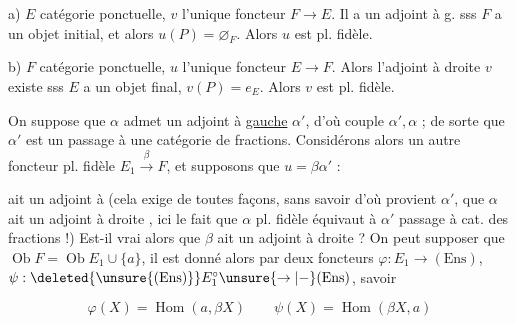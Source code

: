 

a) $E$ catégorie ponctuelle, $v$ l'unique foncteur $F\to E$. Il a un adjoint à g.  sss $F$ a un objet initial, et alors $u(P)=\varnothing_F$. Alors $u$ est pl. fidèle.

b) $F$ catégorie ponctuelle, $u$ l'unique foncteur $E\to F$. Alors l'adjoint à droite $v$ existe sss $E$ a un objet final, $v(P)=e_E$. Alors $v$ est pl. fidèle.


On suppose que $\alpha$ admet un adjoint à \uline{gauche} $\alpha'$, d'où couple $\alpha',\alpha$ ;  de sorte que $\alpha'$ est un passage à une catégorie de fractions. Considérons alors un autre foncteur pl. fidèle $E_1\xrightarrow{\beta} F$, et supposons que $u=\beta\alpha'$ :


ait un adjoint à  (cela exige de toutes façons, sans savoir d'où provient $\alpha'$, que $\alpha$ ait un adjoint à droite \inserted{$\unsure{\alpha|\gamma}$},  ici le fait que $\alpha$ pl. fidèle équivaut à $\alpha'$ passage à cat. des fractions !) Est-il vrai alors que $\beta$ ait un adjoint à droite ? On peut supposer que  $\operatorname{Ob}F=\operatorname{Ob}E_1\cup\{a\}$, il est donné alors par deux foncteurs $\varphi:E_1\to(\mathrm{Ens})$, $\psi:\deleted{\unsure{(\mathrm{Ens})}}E_1^{\circ}\unsure{\to|{-}}(\mathrm{Ens})$, savoir

\[\varphi(X)=\operatorname{Hom}(a,\beta X)\qquad\psi(X)=\operatorname{Hom}(\beta X,a)\]

